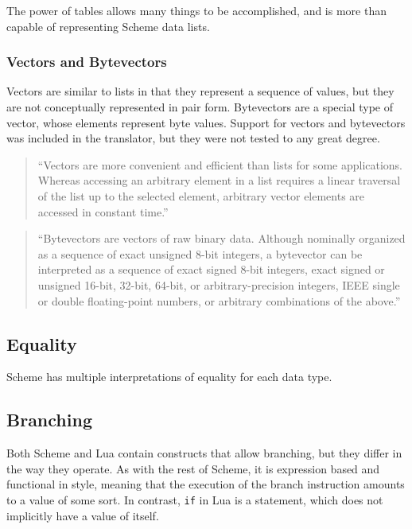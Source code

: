 The power of tables allows many things to be accomplished, and is more than
capable of representing Scheme data lists.


\subsubsection{Vectors and Bytevectors}

Vectors are similar to lists in that they represent a sequence of values, but
they are not conceptually represented in pair form. Bytevectors are a special
type of vector, whose elements represent byte values. Support for vectors and
bytevectors was included in the translator, but they were not tested to any
great degree.
\begin{quote}
``Vectors are more convenient and efficient than lists for some applications.
Whereas accessing an arbitrary element in a list requires a linear traversal of
the list up to the selected element, arbitrary vector elements are accessed in
constant time.''~\cite[Sec~6.9]{tspl}
\end{quote} 

\begin{quote}
``Bytevectors are vectors of raw binary data. Although nominally organized as a
sequence of exact unsigned 8-bit integers, a bytevector can be interpreted as a
sequence of exact signed 8-bit integers, exact signed or unsigned 16-bit,
32-bit, 64-bit, or arbitrary-precision integers, IEEE single or double
floating-point numbers, or arbitrary combinations of the
above.''~\cite[Sec~6.10]{tspl}
\end{quote} 

\subsection{Equality}

Scheme has multiple interpretations of equality for each data type.

\subsection{Branching}

Both Scheme and Lua contain constructs that allow branching, but they differ in
the way they operate. As with the rest of Scheme, it is expression based and
functional in style, meaning that the execution of the branch instruction
amounts to a value of some sort. In contrast, \texttt{if} in Lua is a statement,
which does not implicitly have a value of itself.

